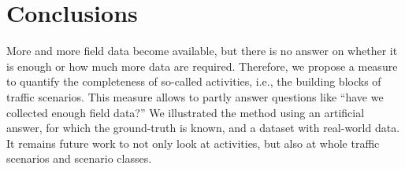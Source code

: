 \section{Conclusions}
\label{sec:conclusion}

More and more field data become available, but there is no answer on whether it is enough or how much more data are required. Therefore, we propose a measure to quantify the completeness of so-called activities, i.e., the building blocks of traffic scenarios. This measure allows to partly answer questions like ``have we collected enough field data?'' We illustrated the method using an artificial answer, for which the ground-truth is known, and a dataset with real-world data. It remains future work to not only look at activities, but also at whole traffic scenarios and scenario classes.

